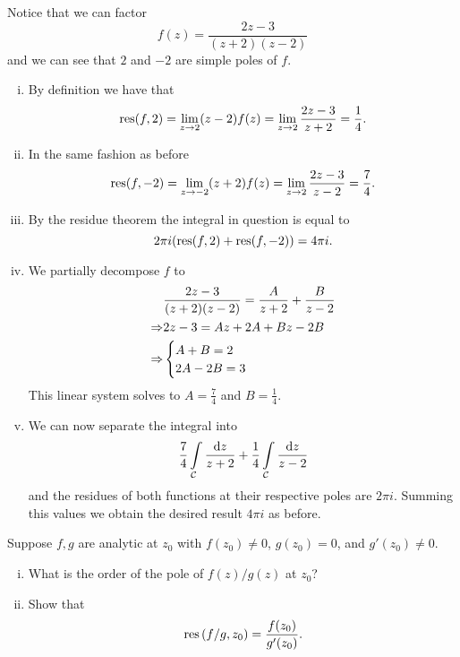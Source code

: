 \documentclass[12pt]{memoir}
\begin{document}
\begin{ptcbr}
    Notice that we can factor 
    $$f(z)=\frac{2z-3}{(z+2)(z-2)}$$
    and we can see that $2$ and $-2$ are simple poles of $f$.
    \begin{enumerate}[i)]
        \itemsep=-0.4em
        \item By definition we have that 
        $$\operatorname*{res}(f,2)=\lim_{z\to 2}(z-2)f(z)=\lim_{z\to 2}\frac{2z-3}{z+2}=\frac{1}{4}.$$
        \item In the same fashion as before
        $$\operatorname*{res}(f,-2)=\lim_{z\to -2}(z+2)f(z)=\lim_{z\to 2}\frac{2z-3}{z-2}=\frac{7}{4}.$$
        \item By the residue theorem the integral in question is equal to 
        $$2\pi i(\operatorname*{res}(f,2)+\operatorname*{res}(f,-2))=4\pi i.$$
        \item We partially decompose $f$ to 
        \begin{align*}
            &\frac{2z-3}{(z+2)(z-2)}=\frac{A}{z+2}+\frac{B}{z-2}\\    
            \Rightarrow&2z-3=Az+2A+Bz-2B\\
            \Rightarrow&\begin{cases}
                A+B=2\\
                2A-2B=3
            \end{cases}
        \end{align*}
        This linear system solves to $A=\frac{7}{4}$ and $B=\frac{1}{4}$. 
        \item We can now separate the integral into 
        $$\frac74\int\limits_{\mathcal{C}}\frac{\dd z}{z+2}+\frac14\int\limits_{\mathcal{C}}\frac{\dd z}{z-2}$$
        and the residues of both functions at their respective poles are $2\pi i$. Summing this values we obtain the desired result $4\pi i$ as before.
    \end{enumerate}
\end{ptcbr}
\begin{Ej}
    Suppose $f,g$ are analytic at $z_0$ with $f(z_0)\neq 0$, $g(z_0)=0$, and $g'(z_0)\neq 0$.
    \begin{enumerate}[i)]
        \itemsep=-0.4em
        \item What is the order of the pole of $f(z)/g(z)$ at $z_0$?
        \item Show that 
$$\operatorname*{res}\left(f/g,z_0\right)=\frac{f(z_0)}{g'(z_0)}.$$
    \end{enumerate}
\end{Ej}
\end{document}
